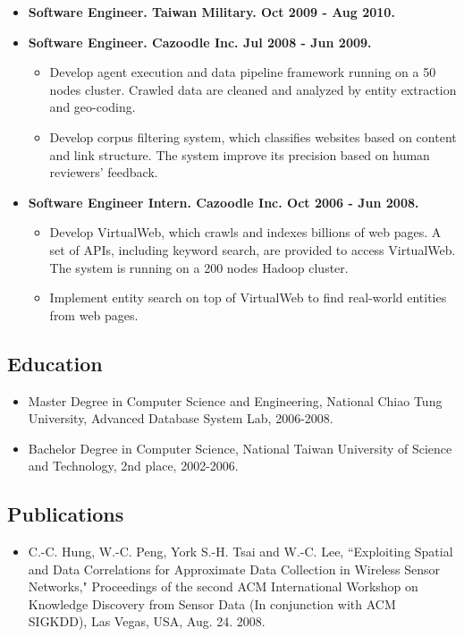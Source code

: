 \documentclass[10pt]{article}
\begin{document}
\begin{itemize}
\item \textbf{Software Engineer. Taiwan Military. Oct 2009 - Aug 2010.}

\item \textbf{Software Engineer. Cazoodle Inc. Jul 2008 - Jun 2009.}
\begin{itemize}
\item Develop agent execution and data pipeline framework running on a 50 nodes cluster. Crawled data are cleaned and analyzed by entity extraction and geo-coding.
\item Develop corpus filtering system, which classifies websites based on content and link structure. The system improve its precision based on human reviewers' feedback.
\end{itemize}

\item \textbf{Software Engineer Intern. Cazoodle Inc. Oct 2006 - Jun 2008.}
\begin{itemize}
\item Develop VirtualWeb, which crawls and indexes billions of web pages. A set of APIs, including keyword search, are provided to access VirtualWeb. The system is running on a 200 nodes Hadoop cluster.
\item Implement entity search on top of VirtualWeb to find real-world entities from web pages.
\end{itemize}

\end{itemize}

\subsection*{Education}
\begin{itemize}
\item Master Degree in Computer Science and Engineering, National Chiao Tung University, Advanced Database System Lab, 2006-2008.
\item Bachelor Degree in Computer Science, National Taiwan University of Science and Technology, 2nd place, 2002-2006.
\end{itemize}

\subsection*{Publications}
\begin{itemize}
\item C.-C. Hung, W.-C. Peng, York S.-H. Tsai and W.-C. Lee, ``Exploiting Spatial and Data Correlations for Approximate Data Collection in Wireless Sensor Networks," Proceedings of the second ACM International Workshop on Knowledge Discovery from Sensor Data (In conjunction with ACM SIGKDD), Las Vegas, USA, Aug. 24. 2008.
\end{itemize}
\end{document}
